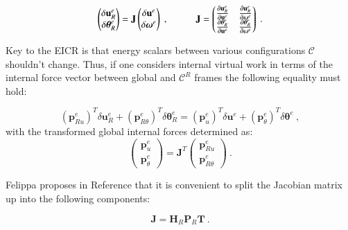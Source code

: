 \begin{equation} 
\begin{pmatrix}
\delta \mathbf{u}_{R}^e \\
\delta \boldsymbol{\theta}_{R}^e
\end{pmatrix}
=
\mathbf{J}
\begin{pmatrix}
\delta \mathbf{u}^e \\
\delta \boldsymbol{\omega}^e
\end{pmatrix}\ ,
\hspace{10mm}
\mathbf{J} = 
\begin{pmatrix}
\frac{\partial \mathbf{u}_R^e}{\partial \mathbf{u}^e} & \frac{\partial \mathbf{u}_R^e}{\partial \boldsymbol{\omega}^e} \\
\frac{\partial \boldsymbol{\theta}_R^e}{\partial \mathbf{u}^e} & \frac{\partial \boldsymbol{\theta}_R^e}{\partial \boldsymbol{\omega}^e}
\end{pmatrix}
\label{eq_cr6}\ .
\end{equation}

Key to the EICR is that energy scalars between various configurations $\mathscr{C}$ shouldn't change. Thus, if one considers internal virtual work in terms of the internal force vector between global and $\mathscr{C}^R$ frames the following equality must hold:

\begin{equation} 
(\mathbf{p}_{Ru}^{e})^T  \delta \mathbf{u}_{R}^e +
(\mathbf{p}_{R\theta}^{e})^T \delta \boldsymbol{\theta}_{R}^e =
(\mathbf{p}_{u}^{e})^T  \delta \mathbf{u}_{}^e +
(\mathbf{p}_{\theta}^{e})^T \delta \boldsymbol{\theta}_{}^e
\label{eq_cr7}\ ,
\end{equation}
with the transformed global internal forces determined as:
\begin{equation} 
\begin{pmatrix}
\mathbf{p}_{u}^e \\
\mathbf{p}_{\theta}^e 
\end{pmatrix}
=
\mathbf{J}^T
\begin{pmatrix}
\mathbf{p}_{Ru}^e \\
\mathbf{p}_{R\theta}^e 
\end{pmatrix}
\label{eq_cr8}\ .
\end{equation}

Felippa proposes in Reference \cite{felippa2005unified} that it is convenient to split the Jacobian matrix up into the following components:

\begin{equation} 
\mathbf{J}
= \mathbf{H}_R 
\mathbf{P}_R 
\mathbf{T}
\label{eq_cr9}\ .
\end{equation}

